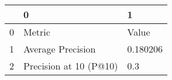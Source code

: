 \begin{tabular}{lll}
\toprule
{} &                       0 &         1 \\
\midrule
0 &                  Metric &     Value \\
1 &       Average Precision &  0.180206 \\
2 &  Precision at 10 (P@10) &       0.3 \\
\bottomrule
\end{tabular}
